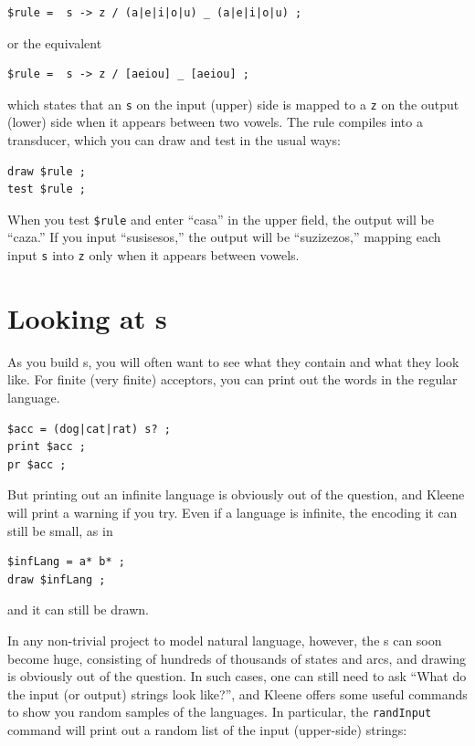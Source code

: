 \begin{Verbatim}
$rule =  s -> z / (a|e|i|o|u) _ (a|e|i|o|u) ;
\end{Verbatim}

\noindent
or the equivalent

\begin{Verbatim}
$rule =  s -> z / [aeiou] _ [aeiou] ;
\end{Verbatim}

\noindent
which states that an \texttt{s} on the input (upper) side is mapped to a
\texttt{z} on the output (lower)
side when it appears between two vowels.  The rule compiles into a transducer, which you can
draw and test in the usual ways:

\begin{Verbatim}
draw $rule ;
test $rule ;
\end{Verbatim}

\noindent
When you test \verb!$rule! and enter ``casa'' in the upper field, the output will be ``caza.''  If you input
``susisesos,'' the output will be ``suzizezos,'' mapping each input \texttt{s} into \texttt{z} only when it
appears between vowels.


\section{Looking at \fsm{}s}

As you build \fsm{}s, you will often want to see what they contain and what they look like. 
For finite (very finite) acceptors, you can print out the words in the regular language.


\begin{Verbatim}
$acc = (dog|cat|rat) s? ;
print $acc ;
pr $acc ;
\end{Verbatim}

\noindent
But printing out an infinite language is obviously out of the question, and Kleene will print
a warning if you try.  Even if a language
is infinite, the \fsm{} encoding it can still be small, as in

\begin{Verbatim}
$infLang = a* b* ;
draw $infLang ;
\end{Verbatim}

\noindent
and it can still be drawn.

In any non-trivial project to model natural language, however, the \fsm{}s can soon become huge, consisting of hundreds of
thousands of states and arcs, and drawing is obviously out of the question.  In such cases,
one can still need to ask ``What do the input (or output) strings look like?'', and Kleene
offers some useful commands to show you random samples of the languages.  
In particular, the \texttt{randInput} command will print out
a random list of the input (upper-side) strings:

